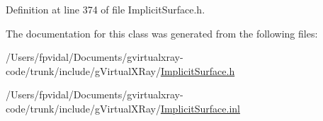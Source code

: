 Definition at line 374 of file ImplicitSurface.h.



The documentation for this class was generated from the following files:\begin{DoxyCompactItemize}
\item 
/Users/fpvidal/Documents/gvirtualxray-\/code/trunk/include/gVirtualXRay/\hyperlink{_implicit_surface_8h}{ImplicitSurface.h}\item 
/Users/fpvidal/Documents/gvirtualxray-\/code/trunk/include/gVirtualXRay/\hyperlink{_implicit_surface_8inl}{ImplicitSurface.inl}\end{DoxyCompactItemize}
